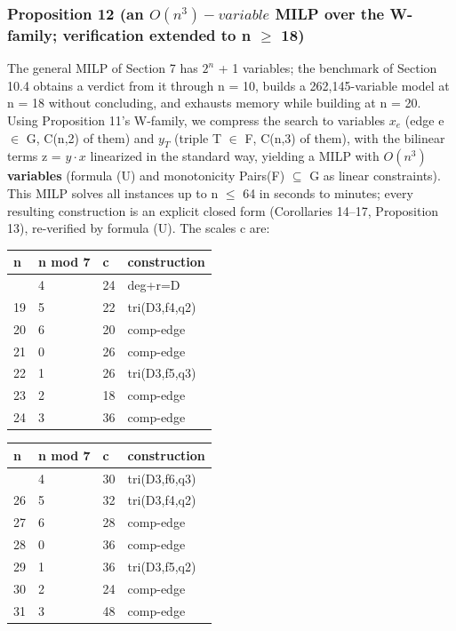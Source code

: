 \documentclass[
]{article}
\begin{document}
\subsubsection{\texorpdfstring{Proposition 12 (an \(O(n^3)-variable\)
MILP over the W-family; verification extended to n \(\ge\)
18)}{Proposition 12 (an O(n\^{}3)-variable MILP over the W-family; verification extended to n \textbackslash ge 18)}}\label{proposition-12-an-onuxb3-variable-milp-over-the-w-family-verification-extended-to-n-18}

The general MILP of Section 7 has \(2^n\) + 1 variables; the benchmark
of Section 10.4 obtains a verdict from it through n = 10, builds a
262,145-variable model at n = 18 without concluding, and exhausts memory
while building at n = 20. Using Proposition 11's W-family, we compress
the search to variables \(x_e\) (edge e \(\in\) G, C(n,2) of them) and
\(y_T\) (triple T \(\in\) F, C(n,3) of them), with the bilinear terms z
= \(y\cdot x\) linearized in the standard way, yielding a MILP with
\textbf{\(O(n^3)\) variables} (formula (U) and monotonicity Pairs(F)
\(\subseteq\) G as linear constraints). This MILP solves all instances
up to n \(\le\) 64 in seconds to minutes; every resulting construction
is an explicit closed form (Corollaries 14--17, Proposition 13),
re-verified by formula (U). The scales c are:

\begin{longtable}[]{@{}llll@{}}
\toprule\noalign{}
n & n mod 7 & c & construction \\
\midrule\noalign{}
\endhead
\bottomrule\noalign{}
\endlastfoot
18 & 4 & 24 & deg+r=D \\
19 & 5 & 22 & tri(D3,f4,q2) \\
20 & 6 & 20 & comp-edge \\
21 & 0 & 26 & comp-edge \\
22 & 1 & 26 & tri(D3,f5,q3) \\
23 & 2 & 18 & comp-edge \\
24 & 3 & 36 & comp-edge \\
\end{longtable}

\begin{longtable}[]{@{}llll@{}}
\toprule\noalign{}
n & n mod 7 & c & construction \\
\midrule\noalign{}
\endhead
\bottomrule\noalign{}
\endlastfoot
25 & 4 & 30 & tri(D3,f6,q3) \\
26 & 5 & 32 & tri(D3,f4,q2) \\
27 & 6 & 28 & comp-edge \\
28 & 0 & 36 & comp-edge \\
29 & 1 & 36 & tri(D3,f5,q2) \\
30 & 2 & 24 & comp-edge \\
31 & 3 & 48 & comp-edge \\
\end{longtable}
\end{document}
